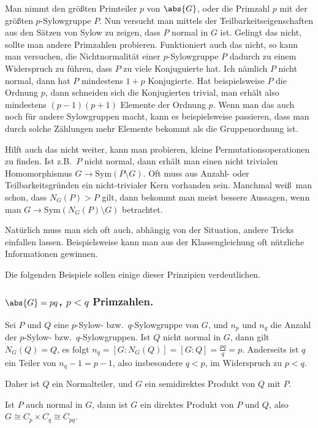 \documentclass[12pt,a4paper,twoside]{article}
\begin{document}
Man nimmt den gr\"o\ss ten Primteiler $p$ von $\abs{G}$, oder die Primzahl $p$
mit der gr\"o\ss ten $p$-Sylowgruppe $P$. Nun versucht man mittels der
Teilbarkeitseigenschaften aus den S\"atzen von Sylow zu zeigen, dass $P$
normal in $G$ ist. Gelingt das nicht, sollte man andere Primzahlen
probieren. Funktioniert auch das nicht, so kann man versuchen, die
Nichtnormalit\"at einer $p$-Sylowgruppe $P$ dadurch zu einem Widerspruch zu
f\"uhren, dass $P$ zu viele Konjuguierte hat. Ich n\"amlich $P$ nicht normal,
dann hat $P$ mindestens $1+p$ Konjugierte. Hat beispielsweise $P$ die Ordnung
$p$, dann schneiden sich die Konjugierten trivial, man erh\"alt also
mindestens $(p-1)(p+1)$ Elemente der Ordnung $p$. Wenn man das auch noch f\"ur
andere Sylowgruppen macht, kann es beispielsweise passieren, dass man durch
solche Z\"ahlungen mehr Elemente bekommt als die Gruppenordnung ist.

Hilft auch das nicht weiter, kann man probieren, kleine
Permutationsoperationen zu finden. Ist z.B.\ $P$ nicht normal, dann erh\"alt
man einen nicht trivialen Homomorphismus $G\to\text{Sym}(P\setminus G)$. Oft
muss aus Anzahl- oder Teilbarkeitsgr\"unden ein nicht-trivialer Kern vorhanden
sein. Manchmal wei\ss\ man schon, dass $N_G(P)>P$ gilt, dann bekommt man meist
bessere Aussagen, wenn man $G\to\text{Sym}(N_G(P)\setminus G)$ betrachtet.

Nat\"urlich muss man sich oft auch, abh\"angig von der Situation, andere
Tricks einfallen lassen. Beispielsweise kann man aus der Klassengleichung oft
n\"utzliche Informationen gewinnen.

Die folgenden Beispiele sollen einige dieser Prinzipien verdeutlichen.

\subsubsection{$\abs{G}=pq$, $p<q$ Primzahlen.}\label{sss:A}
Sei $P$ und $Q$ eine $p$-Sylow- bzw.\ $q$-Sylowgruppe von $G$, und $n_p$ und
$n_q$ die Anzahl der $p$-Sylow- bzw.\ $q$-Sylowgruppen. Ist $Q$ nicht
normal in $G$, dann gilt $N_G(Q)=Q$, es folgt
$n_q=[G:N_G(Q)]=[G:Q]=\frac{pq}{q}=p$. Anderseits ist $q$ ein Teiler von
$n_q-1=p-1$, also insbesondere $q<p$, im Widerspruch zu $p<q$.

Daher ist $Q$ ein Normalteiler, und $G$ ein semidirektes Produkt von $Q$ mit
$P$.

Ist $P$ auch normal in $G$, dann ist $G$ ein direktes Produkt von $P$ und $Q$,
also $G\cong C_p\times C_q\cong C_{pq}$.
\end{document}
